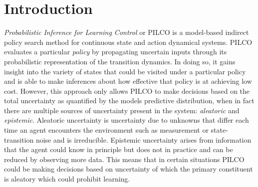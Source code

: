 
\chapter{Introduction}  %

\ifpdf
    \graphicspath{{Chapter1/Figs/Raster/}{Chapter1/Figs/PDF/}{Chapter1/Figs/}}
\else
    \graphicspath{{Chapter1/Figs/Vector/}{Chapter1/Figs/}{Chapter1/Figures/}}
\fi


\textit{Probabilistic Inference for Learning Control} or PILCO \citep{deisenroth2011pilco} is a model-based indirect policy search method for continuous state and action dynamical systems. PILCO evaluates a particular \textit{policy} by propagating uncertain inputs through its probabilistic representation of the transition dynamics. In doing so, it gains insight into the variety of states that could be visited under a particular policy and is able to make inferences about how effective that policy is at achieving low cost. However, this approach only allows PILCO to make decisions based on the total uncertainty as quantified by the models predictive distribution, when in fact there are multiple sources of uncertainty present in the system: \textit{aleatoric} and \textit{epistemic}. Aleatoric uncertainty is uncertainty due to unknowns that differ each time an agent encounters the environment such as measurement or state-transition noise and is irreducible. Epistemic uncertainty arises from information that the agent could know in principle but does not in practice and can be reduced by observing more data. This means that in certain situations PILCO could be making decisions based on uncertainty of which the primary constituent is aleatory which could prohibit learning.

